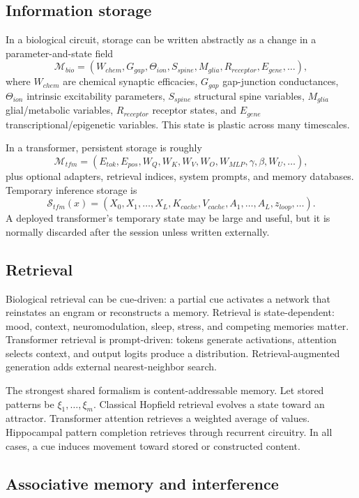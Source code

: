 \documentclass[11pt]{article}
\newcommand{\1}{\mathbf{1}}
\begin{document}
\subsection{Information storage}

In a biological circuit, storage can be written abstractly as a change in a parameter-and-state field
\[
\mathcal{M}_{bio}=(W_{chem},G_{gap},\Theta_{ion},S_{spine},M_{glia},R_{receptor},E_{gene},\ldots),
\]
where $W_{chem}$ are chemical synaptic efficacies, $G_{gap}$ gap-junction conductances, $\Theta_{ion}$ intrinsic excitability parameters, $S_{spine}$ structural spine variables, $M_{glia}$ glial/metabolic variables, $R_{receptor}$ receptor states, and $E_{gene}$ transcriptional/epigenetic variables. This state is plastic across many timescales.

In a transformer, persistent storage is roughly
\[
\mathcal{M}_{tfm}=(E_{tok},E_{pos},W_Q,W_K,W_V,W_O,W_{MLP},\gamma,\beta,W_U,\ldots),
\]
plus optional adapters, retrieval indices, system prompts, and memory databases. Temporary inference storage is
\[
\mathcal{S}_{tfm}(x)=(X_0,X_1,\ldots,X_L,K_{cache},V_{cache},A_1,\ldots,A_L,z_{loop},\ldots).
\]
A deployed transformer's temporary state may be large and useful, but it is normally discarded after the session unless written externally.

\subsection{Retrieval}

Biological retrieval can be cue-driven: a partial cue activates a network that reinstates an engram or reconstructs a memory. Retrieval is state-dependent: mood, context, neuromodulation, sleep, stress, and competing memories matter. Transformer retrieval is prompt-driven: tokens generate activations, attention selects context, and output logits produce a distribution. Retrieval-augmented generation adds external nearest-neighbor search.

The strongest shared formalism is content-addressable memory. Let stored patterns be $\xi_1,\ldots,\xi_m$. Classical Hopfield retrieval evolves a state toward an attractor. Transformer attention retrieves a weighted average of values. Hippocampal pattern completion retrieves through recurrent circuitry. In all cases, a cue induces movement toward stored or constructed content.

\subsection{Associative memory and interference}
\end{document}

